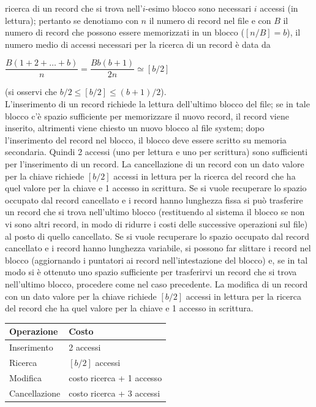 ricerca di un record che si trova nell'$i$-esimo blocco sono necessari $i$ accessi (in lettura); 
pertanto se denotiamo con $n$ il numero di record nel file e con $B$ il numero di record che possono 
essere memorizzati in un blocco ($[n/B]=b$), il numero medio di accessi necessari per la ricerca di un 
record è data da
\begin{center}
$\dfrac{B(1+2+\ldots +b)}{n} = \dfrac{Bb(b+1)}{2n} \simeq [b/2]$ 
\end{center}
(si osservi che $b/2\leq[b/2] \leq (b+1)/2$).\\
L'inserimento di un record richiede la lettura dell'ultimo blocco del file; se in tale blocco c'è spazio
sufficiente per memorizzare il nuovo record, il record viene inserito, altrimenti viene chiesto un
nuovo blocco al file system; dopo l'inserimento del record nel blocco, il blocco deve essere scritto
su memoria secondaria. Quindi 2 accessi (uno per lettura e uno per scrittura) sono sufficienti per
l'inserimento di un record. La cancellazione di un record con un dato valore per la chiave richiede
$[b/2]$ accessi in lettura per la ricerca del record che ha quel valore per la chiave e 1 accesso in
scrittura. Se si vuole recuperare lo spazio occupato dal record cancellato e i record hanno lunghezza
fissa si può trasferire un record che si trova nell'ultimo blocco (restituendo al sistema il blocco se
non vi sono altri record, in modo di ridurre i costi delle successive operazioni sul file) al posto di
quello cancellato. Se si vuole recuperare lo spazio occupato dal record cancellato e i record hanno
lunghezza variabile, si possono far slittare i record nel blocco (aggiornando i puntatori ai record
nell'intestazione del blocco) e, se in tal modo si è ottenuto uno spazio sufficiente per trasferirvi un
record che si trova nell'ultimo blocco, procedere come nel caso precedente. La modifica di un
record con un dato valore per la chiave richiede $[b/2]$ accessi in lettura per la ricerca del record che
ha quel valore per la chiave e 1 accesso in scrittura.\\
\begin{center}
 \begin{tabular}{l|l}
  \textbf{Operazione} & \textbf{Costo}\\
  \hline
  Inserimento & 2 accessi\\
  Ricerca & $[b/2]$ accessi\\
  Modifica & costo ricerca + 1 accesso\\
  Cancellazione & costo ricerca + 3 accessi\\
 \end{tabular}

\end{center}


